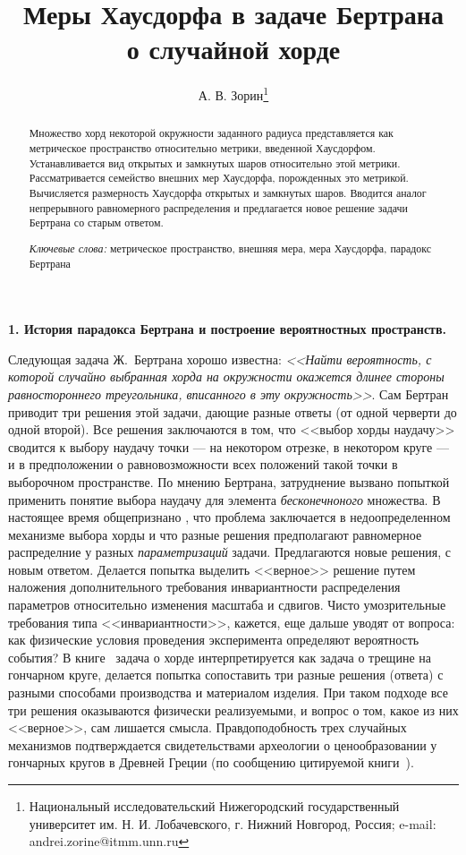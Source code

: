 \documentclass[12pt]{article}
\title{Меры Хаусдорфа в задаче Бертрана \\о случайной хорде}
\author{А. В. Зорин\footnote{Национальный исследовательский Нижегородский
    государственный университет им. Н. И. Лобачевского, г. Нижний Новгород,
    Россия; e-mail: andrei.zorine@itmm.unn.ru}} \date{}
\begin{document}
\maketitle


\begin{abstract}
  Множество хорд некоторой окружности заданного радиуса представляется
  как метрическое пространство относительно метрики, введенной
  Хаусдорфом. Устанавливается вид открытых и замкнутых шаров относительно этой
  метрики. Рассматривается семейство внешних мер Хаусдорфа, порожденных это
  метрикой.  Вычисляется размерность Хаусдорфа открытых и замкнутых
  шаров. Вводится аналог непрерывного равномерного распределения и предлагается
  новое решение задачи Бертрана со старым ответом.
  
  \emph{Ключевые слова:}\/ метрическое пространство, внешняя мера, мера
  Хаусдорфа, парадокс Бертрана
\end{abstract}

\bigskip

\textbf{1. История парадокса Бертрана и построение вероятностных пространств.}

Следующая задача Ж.~Бертрана хорошо известна: \textit{<<Найти вероятность, с
  которой случайно выбранная хорда на окружности окажется длинее стороны
  равностороннего треугольника, вписанного в эту окружность>>}. Сам
Бертран~\cite{Bertrand} приводит три решения этой задачи, дающие разные ответы
(от одной черверти до одной второй). Все решения заключаются в том, что <<выбор
хорды наудачу>> сводится к выбору наудачу точки --- на некотором отрезке, в
некотором круге --- и в предположении о равновозможности всех положений такой
точки в выборочном пространстве. По мнению Бертрана, затруднение вызвано
попыткой применить понятие выбора наудачу для элемента \emph{бесконечноного}
множества.  В настоящее время общепризнано
\cite{Gnedenko,Sekely,Fedotkin,Gantsevich,Kaushik:2022}, что проблема
заключается в недоопределенном механизме выбора хорды и что разные решения
предполагают равномерное распределние у разных \emph{параметризаций}
задачи. Предлагаются новые решения, с новым ответом. Делается попытка выделить
<<верное>> решение путем наложения дополнительного требования инвариантности
распределения параметров относительно изменения масштаба и сдвигов. Чисто
умозрительные требования типа <<инвариантности>>, кажется, еще дальше уводят от
вопроса: как физические условия проведения эксперимента определяют вероятность
события? В книге~\cite[с.106--109]{Fedotkin} задача о хорде интерпретируется как
задача о трещине на гончарном круге, делается попытка сопоставить три разные
решения (ответа) с разными способами производства и материалом изделия. При
таком подходе все три решения оказываются физически реализуемыми, и вопрос о
том, какое из них <<верное>>, сам лишается смысла. Правдоподобность трех
случайных механизмов подтверждается свидетельствами археологии о ценообразовании
у гончарных кругов в Древней Греции (по сообщению цитируемой
книги~\cite{Fedotkin}).
\end{document}
